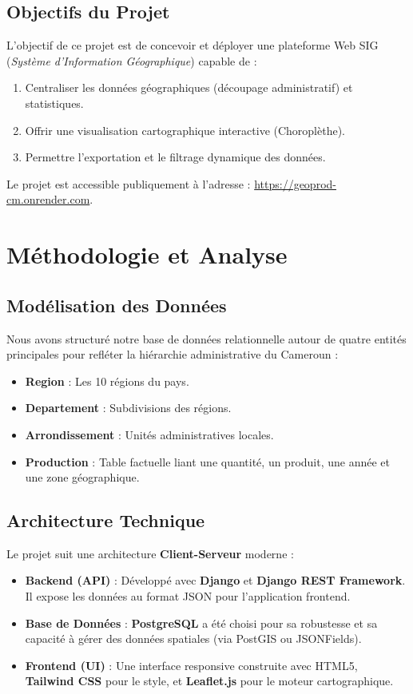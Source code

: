 \documentclass[a4paper,12pt]{report}
\begin{document}
\section{Objectifs du Projet}
L'objectif de ce projet est de concevoir et déployer une plateforme Web SIG (\textit{Système d'Information Géographique}) capable de :
\begin{enumerate}
    \item Centraliser les données géographiques (découpage administratif) et statistiques.
    \item Offrir une visualisation cartographique interactive (Choroplèthe).
    \item Permettre l'exportation et le filtrage dynamique des données.
\end{enumerate}

Le projet est accessible publiquement à l'adresse : \url{https://geoprod-cm.onrender.com}.

\chapter{Méthodologie et Analyse}
\section{Modélisation des Données}
Nous avons structuré notre base de données relationnelle autour de quatre entités principales pour refléter la hiérarchie administrative du Cameroun :
\begin{itemize}
    \item \textbf{Region} : Les 10 régions du pays.
    \item \textbf{Departement} : Subdivisions des régions.
    \item \textbf{Arrondissement} : Unités administratives locales.
    \item \textbf{Production} : Table factuelle liant une quantité, un produit, une année et une zone géographique.
\end{itemize}

\section{Architecture Technique}
Le projet suit une architecture \textbf{Client-Serveur} moderne :
\begin{itemize}
    \item \textbf{Backend (API)} : Développé avec \textbf{Django} et \textbf{Django REST Framework}. Il expose les données au format JSON pour l'application frontend.
    \item \textbf{Base de Données} : \textbf{PostgreSQL} a été choisi pour sa robustesse et sa capacité à gérer des données spatiales (via PostGIS ou JSONFields).
    \item \textbf{Frontend (UI)} : Une interface responsive construite avec HTML5, \textbf{Tailwind CSS} pour le style, et \textbf{Leaflet.js} pour le moteur cartographique.
\end{itemize}
\end{document}
